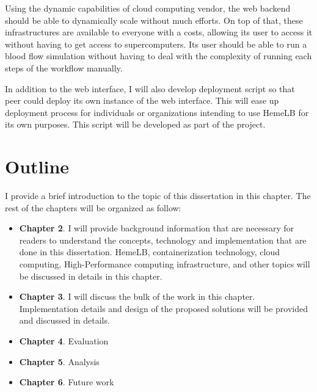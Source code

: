 Using the dynamic capabilities of cloud computing vendor, the web backend should be able to dynamically scale without much efforts. On top of that, these infrastructures are available to everyone with a costs, allowing its user to access it without having to get access to supercomputers. Its user should be able to run a blood flow simulation without having to deal with the complexity of running each steps of the workflow manually.

In addition to the web interface, I will also develop deployment script so that peer could deploy its own instance of the web interface. This will ease up deployment process for individuals or organizations intending to use HemeLB for its own purposes. This script will be developed as part of the project.



\section{Outline}
I provide a brief introduction to the topic of this dissertation in this chapter. The rest of the chapters will be organized as follow:
\begin{itemize}
    \item \textbf{Chapter 2}. I will provide background information that are necessary for readers to understand the concepts, technology and implementation that are done in this dissertation. HemeLB, containerization technology, cloud computing, High-Performance computing infrastructure, and other topics will be discussed in details in this chapter.
    \item \textbf{Chapter 3}. I will discuss the bulk of the work in this chapter. Implementation details and design of the proposed solutions will be provided and discussed in details.
    \item \textbf{Chapter 4}. Evaluation
    \item \textbf{Chapter 5}. Analysis
    \item \textbf{Chapter 6}. Future work
\end{itemize}
